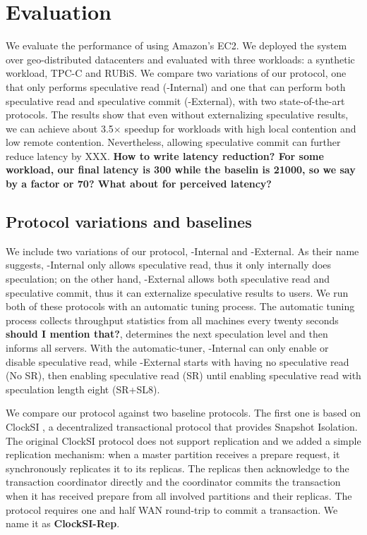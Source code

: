 
\section{Evaluation}
\label{sec:evaluation}
We evaluate the performance of {\specula} using Amazon's EC2. We deployed the system over geo-distributed datacenters and evaluated with three workloads: a synthetic workload, TPC-C and RUBiS. We compare two variations of our protocol, one that only performs speculative read ({\specula}-Internal) and one that can perform both speculative read and speculative commit ({\specula}-External), with two state-of-the-art protocols. The results show that even without externalizing speculative results, we can achieve about 3.5$\times$ speedup for workloads with high local contention and low remote contention. Nevertheless, allowing speculative commit can further reduce latency by XXX. \textbf{How to write latency reduction? For some workload, our final latency is 300 while the baselin is 21000, so we say by a factor or 70? What about for perceived latency?}

\subsection{Protocol variations and baselines}
We include two variations of our protocol, {\specula}-Internal and  {\specula}-External. As their name suggests, {\specula}-Internal only allows speculative read, thus it only internally does speculation; on the other hand, {\specula}-External allows both speculative read and speculative commit, thus it can externalize speculative results to users. We run both of these protocols with an automatic tuning process. The automatic tuning process collects throughput statistics from all machines every twenty seconds \textbf{should I mention that?}, determines the next speculation level and then informs all servers. With the automatic-tuner, {\specula}-Internal can only enable or disable speculative read, while {\specula}-External starts with having no speculative read (No SR), then enabling speculative read (SR) until enabling speculative read with speculation length eight (SR+SL8). 

We compare our protocol against two baseline protocols. The first one is based on ClockSI \cite{clocksi}, a decentralized transactional protocol that provides Snapshot Isolation. The original ClockSI protocol does not support replication and we added a simple replication mechanism: when a master partition receives a prepare request, it synchronously replicates it to its replicas. The replicas then acknowledge to the transaction coordinator directly and the coordinator commits the transaction when it has received prepare from all involved partitions and their replicas. The protocol requires one and half WAN round-trip to commit a transaction. We name it as \textbf{ClockSI-Rep}.

